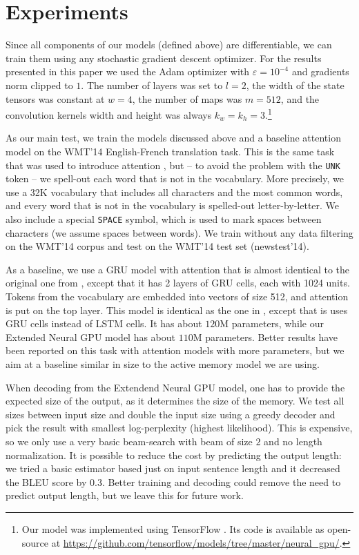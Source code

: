 \documentclass{article}
\begin{document}
\section{Experiments} \label{sec:exp}

Since all components of our models (defined above) are differentiable,
we can train them using any stochastic gradient descent optimizer.
For the results presented in this paper we used the Adam optimizer
\cite{adam} with $\varepsilon=10^{-4}$ and gradients norm clipped to $1$.
The number of layers was set to $l=2$, the width of the state tensors
was constant at $w=4$, the number of maps was $m=512$, and
the convolution kernels width and height was always $k_w=k_h=3$.\footnote{Our model was implemented using TensorFlow \cite{tensorflow}.
  Its code is available as open-source at
  \url{https://github.com/tensorflow/models/tree/master/neural_gpu/}.}

As our main test, we train the models discussed above and a baseline
attention model on the WMT'14 English-French translation task.
This is the same task that was used to introduce attention
\cite{bahdanau2014neural}, but -- to avoid the problem with
the \texttt{UNK} token -- we spell-out each word that is not
in the vocabulary. More precisely, we use a 32K vocabulary that
includes all characters and the most common words, and every
word that is not in the vocabulary is spelled-out letter-by-letter.
We also include a special \texttt{SPACE} symbol, which is used
to mark spaces between characters (we assume spaces between words).
We train without any data filtering on the WMT'14 corpus and
test on the WMT'14 test set (newstest'14).

As a baseline, we use a GRU model with attention that is
almost identical to the original one from \cite{bahdanau2014neural},
except that it has 2 layers of GRU cells, each with 1024 units.
Tokens from the vocabulary are embedded into vectors of size 512,
and attention is put on the top layer. This model is identical as
the one in \cite{KVparse15}, except that is uses GRU cells instead
of LSTM cells. It has about $120$M parameters, while our
Extended Neural GPU model has about $110$M parameters.
Better results have been reported on this task with attention
models with more parameters, but we aim at a baseline similar
in size to the active memory model we are using.

When decoding from the Extendend Neural GPU model, one has to provide
the expected size of the output, as it determines the size of
the memory. We test all sizes between input size and double the input
size using a greedy decoder and pick the result with smallest
log-perplexity (highest likelihood).  This is expensive, so we
only use a very basic beam-search with beam of size $2$ and no
length normalization. It is possible to reduce the cost by predicting
the output length: we tried a basic estimator based just on input
sentence length and it decreased the BLEU score by $0.3$. Better
training and decoding could remove the need to predict output length,
but we leave this for future work.
\end{document}
